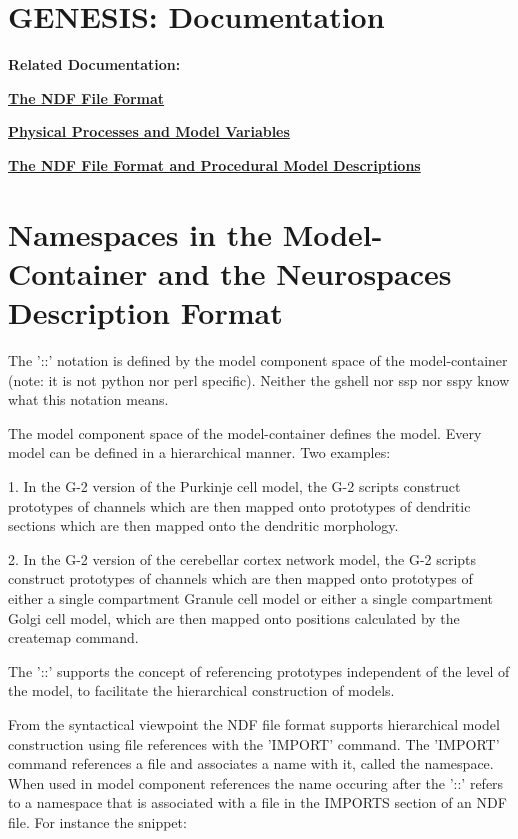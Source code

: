 \documentclass[12pt]{article}
\begin{document}
\section*{GENESIS: Documentation}

{\bf Related Documentation:}

\href{../ndf-file-format/ndf-file-format.tex}{\bf The NDF File Format}

\href{../model-variables/model-variables.tex}{\bf Physical Processes and Model Variables}

\href{../ndf-procedural-description/ndf-procedural-description.tex}{\bf The NDF File Format and Procedural Model Descriptions}


\section*{Namespaces in the Model-Container and the Neurospaces Description Format}


The '::' notation is defined by the model component space of the
model-container (note: it is not python nor perl specific).  Neither
the gshell nor ssp nor sspy know what this notation means.

The model component space of the model-container defines the model.
Every model can be defined in a hierarchical manner.  Two examples:

1. In the G-2 version of the Purkinje cell model, the G-2 scripts
construct prototypes of channels which are then mapped onto prototypes
of dendritic sections which are then mapped onto the dendritic
morphology.

2. In the G-2 version of the cerebellar cortex network model, the G-2
scripts construct prototypes of channels which are then mapped onto
prototypes of either a single compartment Granule cell model or either
a single compartment Golgi cell model, which are then mapped onto
positions calculated by the createmap command.

The '::' supports the concept of referencing prototypes independent of
the level of the model, to facilitate the hierarchical construction of
models.

From the syntactical viewpoint the NDF file format supports
hierarchical model construction using file references with the
'IMPORT' command.  The 'IMPORT' command references a file and
associates a name with it, called the namespace.  When used in model
component references the name occuring after the '::' refers to a
namespace that is associated with a file in the IMPORTS section of an
NDF file.  For instance the snippet:
\end{document}
